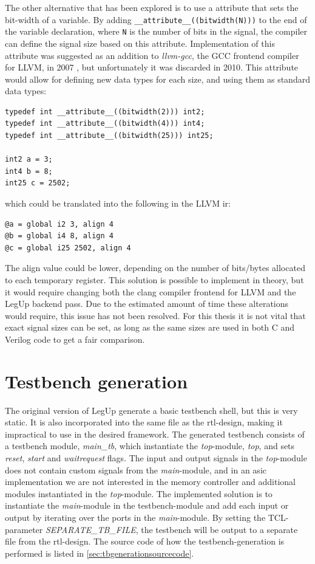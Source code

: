 The other alternative that has been explored is to use a attribute that sets the bit-width of a variable. By adding \verb!__attribute__((bitwidth(N)))! to the end of the variable declaration, where \verb!N! is the number of bits in the signal, the compiler can define the signal size based on this attribute. Implementation of this attribute was suggested as an addition to \textit{llvm-gcc}, the GCC frontend compiler for LLVM, in 2007 \cite{bitwidthattr}, but unfortunately it was discarded in 2010. This attribute would allow for defining new data types for each size, and using them as standard data types:
\begin{lstlisting}
typedef int __attribute__((bitwidth(2))) int2;
typedef int __attribute__((bitwidth(4))) int4;
typedef int __attribute__((bitwidth(25))) int25;

int2 a = 3;
int4 b = 8;
int25 c = 2502;
\end{lstlisting}
which could be translated into the following in the LLVM \gls{ir}:
\begin{lstlisting}
@a = global i2 3, align 4
@b = global i4 8, align 4
@c = global i25 2502, align 4
\end{lstlisting}
The align value could be lower, depending on the number of bits/bytes allocated to each temporary register. This solution is possible to implement in theory, but it would require changing both the clang compiler frontend for LLVM and the LegUp backend pass. Due to the estimated amount of time these alterations would require, this issue has not been resolved. For this thesis it is not vital that exact signal sizes can be set, as long as the same sizes are used in both C and Verilog code to get a fair comparison.

\section{\label{subsec:tbgen}Testbench generation}
The original version of LegUp generate a basic testbench shell, but this is very static. It is also incorporated into the same file as the \gls{rtl}-design, making it impractical to use in the desired framework. The generated testbench consists of a testbench module, \textit{main\_tb}, which instantiate the \textit{top}-module, \textit{top}, and sets \textit{reset}, \textit{start} and \textit{waitrequest} flags. The input and output signals in the \textit{top}-module does not contain custom signals from the \textit{main}-module, and in an \gls{asic} implementation we are not interested in the memory controller and additional modules instantiated in the \textit{top}-module. The implemented solution is to instantiate the \textit{main}-module in the testbench-module and add each input or output by iterating over the ports in the \textit{main}-module. By setting the TCL-parameter \textit{SEPARATE\_TB\_FILE}, the testbench will be output to a separate file from the \gls{rtl}-design. The source code of how the testbench-generation is performed is listed in \cref{sec:tbgenerationsourcecode}.

